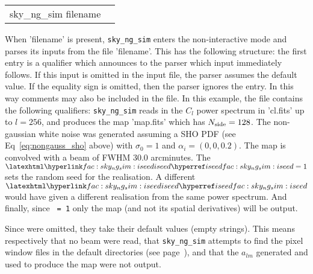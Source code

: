 \begin{examples}{2}
{
\begin{tabular}{ll} %
sky\_ng\_sim  filename \\
\end{tabular}
}
{When 'filename' is present, {\tt sky\_ng\_sim} enters the non-interactive mode and parses
its inputs from the file 'filename'. This has the following
structure: the first entry is a qualifier which announces to the parser
which input immediately follows. If this input is omitted in the
input file, the parser assumes the default value.
If the equality sign is omitted, then the parser ignores the entry.
In this way comments may also be included in the file.
In this example, the file contains the following qualifiers:\hfill\newline
{}
{\tt sky\_ng\_sim} reads in the $C_l$ power spectrum in 'cl.fits' up to $l=256$, and produces the map
'map.fits' which has $N_{\rm side}=128$. The non-gaussian white noise was generated
assuming a SHO PDF (see Eq~\ref{eq:nongauss_sho} above) with $\sigma_0=1$ and
$\alpha_i = (0, 0, 0.2)$.
The map is convolved with a beam of FWHM 30.0 arcminutes. The $\mylink{fac:sky_ng_sim:iseed}{iseed}%
=1$ sets
the random seed for the realisation. A different $\mylink{fac:sky_ng_sim:iseed}{iseed}%
$ would have given a different 
realisation from the same power spectrum. And finally, since {\tt {}%
 =
1} only the map (and not its spatial derivatives) will be output.

Since \hfill\newline
{}
were omitted, they take their default values (empty strings). 
This means respectively that no beam were read, that {\tt sky\_ng\_sim} attempts to find the pixel
window files in the default directories (see page~\pageref{page:defdir}), and
that the $a_{lm}$ generated and used to produce the map were not output.
}
\end{examples}


